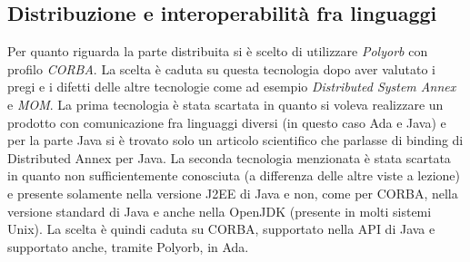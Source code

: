 \subsection{Distribuzione e interoperabilit\`{a} fra linguaggi}
Per quanto riguarda la parte distribuita si \`{e} scelto di utilizzare \emph{Polyorb} con profilo \emph{CORBA}. La scelta  \`{e} caduta su questa tecnologia dopo aver valutato i pregi e i difetti delle altre tecnologie come ad esempio \emph{Distributed System Annex} e \emph{MOM}. La prima tecnologia \`{e} stata scartata in quanto si voleva realizzare un prodotto con comunicazione fra linguaggi diversi (in questo caso Ada e Java) e per la parte Java si \`{e} trovato solo un articolo scientifico che parlasse di binding di Distributed Annex per Java. La seconda tecnologia menzionata \`{e} stata scartata in quanto non sufficientemente conosciuta (a differenza delle altre viste a lezione) e presente solamente nella versione J2EE di Java e non, come per CORBA, nella versione standard di Java e anche nella OpenJDK (presente in molti sistemi Unix). La scelta \`{e} quindi caduta su CORBA, supportato nella API di Java e supportato anche, tramite Polyorb, in Ada.
